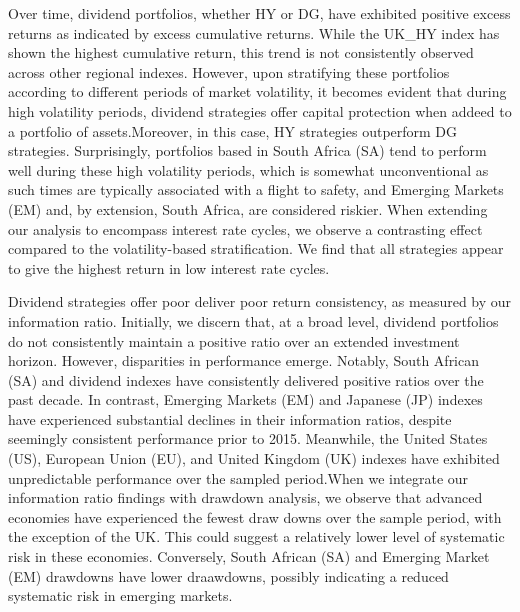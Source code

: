 \documentclass[11pt,preprint, authoryear]{elsarticle}
\numberwithin{equation}{section}
\numberwithin{figure}{section}
\numberwithin{table}{section}
\begin{document}
Over time, dividend portfolios, whether HY or DG, have exhibited
positive excess returns as indicated by excess cumulative returns. While
the UK\_HY index has shown the highest cumulative return, this trend is
not consistently observed across other regional indexes. However, upon
stratifying these portfolios according to different periods of market
volatility, it becomes evident that during high volatility periods,
dividend strategies offer capital protection when addeed to a portfolio
of assets.Moreover, in this case, HY strategies outperform DG
strategies. Surprisingly, portfolios based in South Africa (SA) tend to
perform well during these high volatility periods, which is somewhat
unconventional as such times are typically associated with a flight to
safety, and Emerging Markets (EM) and, by extension, South Africa, are
considered riskier. When extending our analysis to encompass interest
rate cycles, we observe a contrasting effect compared to the
volatility-based stratification. We find that all strategies appear to
give the highest return in low interest rate cycles.

Dividend strategies offer poor deliver poor return consistency, as
measured by our information ratio. Initially, we discern that, at a
broad level, dividend portfolios do not consistently maintain a positive
ratio over an extended investment horizon. However, disparities in
performance emerge. Notably, South African (SA) and dividend indexes
have consistently delivered positive ratios over the past decade. In
contrast, Emerging Markets (EM) and Japanese (JP) indexes have
experienced substantial declines in their information ratios, despite
seemingly consistent performance prior to 2015. Meanwhile, the United
States (US), European Union (EU), and United Kingdom (UK) indexes have
exhibited unpredictable performance over the sampled period.When we
integrate our information ratio findings with drawdown analysis, we
observe that advanced economies have experienced the fewest draw downs
over the sample period, with the exception of the UK. This could suggest
a relatively lower level of systematic risk in these economies.
Conversely, South African (SA) and Emerging Market (EM) drawdowns have
lower draawdowns, possibly indicating a reduced systematic risk in
emerging markets.
\end{document}
